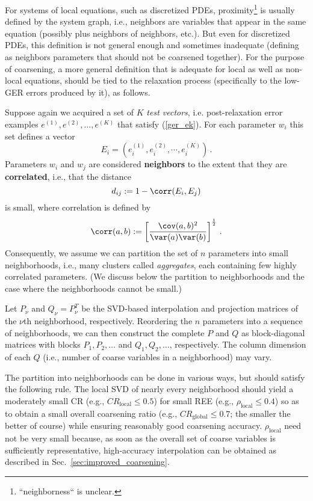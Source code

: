 \documentclass{article} %
\begin{document}
For systems of local equations, such as discretized PDEs, proximity\footnote{``neighborness`` is unclear.} is usually defined by the system graph, i.e., neighbors are variables that appear in the same equation (possibly plus neighbors of neighbors, etc.). But even for discretized PDEs, this definition is not general enough and sometimes inadequate (defining as neighbors parameters that should not be coarsened together). For the purpose of coarsening, a more general definition that is adequate for local as well as non-local equations, should be tied to the relaxation process (specifically to the low-GER errors produced by it), as follows.

Suppose again we acquired a set of $K$ {\it test vectors}, i.e. post-relaxation error examples $e^{(1)}, e^{(2)}, \dots, e^{(K)}$ that satisfy (\ref{ger_ek}). For each parameter $w_i$ this set defines a vector
$$
	E_i = \left( e^{(1)}_i, e^{(2)}_i, \cdots, e^{(K)}_i \right)\,.
$$
Parameters $w_i$ and $w_j$ are considered \textbf{neighbors} to the extent that they are \textbf{correlated}, i.e., that the distance
\begin{equation}
	d_{ij} := 1 - \corr(E_i, E_j)
	\label{dij}
\end{equation}
is small, where correlation is defined by
\begin{equation}
    \corr(a, b) := \left[\frac{\cov(a, b)^2}{\var(a) \var(b)}\right]^{\frac12}\,.
\end{equation}
Consequently, we assume we can partition the set of $n$ parameters into small neighborhoods, i.e., many clusters called {\it aggregates}, each containing few highly correlated parameters.  (We discuss below the partition to neighborhoods and the case where the neighborhoods cannot be small.)

Let $P_{\nu}$ and $Q_{\nu} = P_{\nu}^T$ be the SVD-based interpolation and projection matrices of the $\nu$th neighborhood, respectively. Reordering the $n$ parameters into a sequence of neighborhoods, we can then construct the complete $P$ and $Q$ as block-diagonal matrices with blocks $P_1, P_2, \dots$ and $Q_1, Q_2, \dots$, respectively. The column dimension of each $Q$ (i.e., number of coarse variables in a neighborhood) may vary.

The partition into neighborhoods can be done in various ways, but should satisfy the following rule. The local SVD of nearly every neighborhood should yield a moderately small CR (e.g., $CR_{\text{local}} \leq 0.5$) for small REE (e.g., $\rho_{\text{local}} \leq 0.4$) so as to obtain a small overall coarsening ratio (e.g., $CR_{\text{global}} \leq 0.7$; the smaller the better of course) while ensuring reasonably good coarsening accuracy. $\rho_{\text{local}}$ need not be very small because, as soon as the overall set of coarse variables is sufficiently representative, high-accuracy interpolation can be obtained as described in Sec.~\ref{sec:improved_coarsening}.
\end{document}
